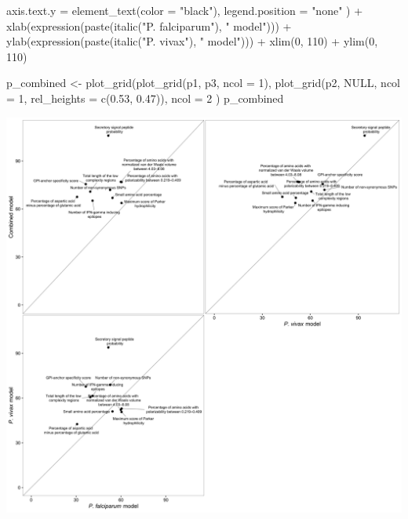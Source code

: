 \documentclass[
  11pt,
  oneside]{book}
\newenvironment{Shaded}{\begin{snugshade}}{\end{snugshade}}
\newcommand{\AttributeTok}[1]{\textcolor[rgb]{0.77,0.63,0.00}{#1}}
\newcommand{\ConstantTok}[1]{\textcolor[rgb]{0.00,0.00,0.00}{#1}}
\newcommand{\DecValTok}[1]{\textcolor[rgb]{0.00,0.00,0.81}{#1}}
\newcommand{\FloatTok}[1]{\textcolor[rgb]{0.00,0.00,0.81}{#1}}
\newcommand{\FunctionTok}[1]{\textcolor[rgb]{0.00,0.00,0.00}{#1}}
\newcommand{\NormalTok}[1]{#1}
\newcommand{\OtherTok}[1]{\textcolor[rgb]{0.56,0.35,0.01}{#1}}
\newcommand{\SpecialCharTok}[1]{\textcolor[rgb]{0.00,0.00,0.00}{#1}}
\newcommand{\StringTok}[1]{\textcolor[rgb]{0.31,0.60,0.02}{#1}}
\begin{document}
\begin{Shaded}
\begin{Highlighting}[]
    \AttributeTok{axis.text.y =} \FunctionTok{element\_text}\NormalTok{(}\AttributeTok{color =} \StringTok{"black"}\NormalTok{),}
    \AttributeTok{legend.position =} \StringTok{"none"}
\NormalTok{  ) }\SpecialCharTok{+}
  \FunctionTok{xlab}\NormalTok{(}\FunctionTok{expression}\NormalTok{(}\FunctionTok{paste}\NormalTok{(}\FunctionTok{italic}\NormalTok{(}\StringTok{"P. falciparum"}\NormalTok{), }\StringTok{" model"}\NormalTok{))) }\SpecialCharTok{+}
  \FunctionTok{ylab}\NormalTok{(}\FunctionTok{expression}\NormalTok{(}\FunctionTok{paste}\NormalTok{(}\FunctionTok{italic}\NormalTok{(}\StringTok{"P. vivax"}\NormalTok{), }\StringTok{" model"}\NormalTok{))) }\SpecialCharTok{+}
  \FunctionTok{xlim}\NormalTok{(}\DecValTok{0}\NormalTok{, }\DecValTok{110}\NormalTok{) }\SpecialCharTok{+}
  \FunctionTok{ylim}\NormalTok{(}\DecValTok{0}\NormalTok{, }\DecValTok{110}\NormalTok{)}
\end{Highlighting}
\end{Shaded}

\begin{Shaded}
\begin{Highlighting}[]
\NormalTok{p\_combined }\OtherTok{\textless{}{-}} \FunctionTok{plot\_grid}\NormalTok{(}\FunctionTok{plot\_grid}\NormalTok{(p1, p3, }\AttributeTok{ncol =} \DecValTok{1}\NormalTok{),}
  \FunctionTok{plot\_grid}\NormalTok{(p2, }\ConstantTok{NULL}\NormalTok{, }\AttributeTok{ncol =} \DecValTok{1}\NormalTok{, }\AttributeTok{rel\_heights =} \FunctionTok{c}\NormalTok{(}\FloatTok{0.53}\NormalTok{, }\FloatTok{0.47}\NormalTok{)),}
  \AttributeTok{ncol =} \DecValTok{2}
\NormalTok{)}
\NormalTok{p\_combined}
\end{Highlighting}
\end{Shaded}

\begin{center}\includegraphics[width=1\linewidth]{./figures/Supplementary Fig 11} \end{center}
\end{document}
